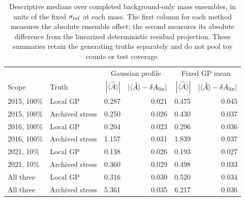 \begin{table}[H]\centering\small
\begin{tabular}{llrrrr}\toprule
 & & \multicolumn{2}{c}{Gaussian profile} & \multicolumn{2}{c}{Fixed GP mean}\\
Scope & Truth & $|\langle\hat A\rangle|$ & $|\langle\hat A\rangle-\delta A_{\rm lin}|$ & $|\langle\hat A\rangle|$ & $|\langle\hat A\rangle-\delta A_{\rm lin}|$\\\midrule
2015, 100\% & Local GP & 0.287 & 0.021 & 0.475 & 0.045\\
2015, 100\% & Archived stress & 0.250 & 0.026 & 0.430 & 0.037\\
2016, 100\% & Local GP & 0.204 & 0.023 & 0.296 & 0.036\\
2016, 100\% & Archived stress & 1.157 & 0.031 & 1.839 & 0.037\\
2021, 10\% & Local GP & 0.138 & 0.026 & 0.193 & 0.027\\
2021, 10\% & Archived stress & 0.360 & 0.029 & 0.498 & 0.033\\
All three & Local GP & 0.316 & 0.030 & 0.520 & 0.034\\
All three & Archived stress & 5.361 & 0.035 & 6.217 & 0.036\\
\bottomrule\end{tabular}
\caption{Descriptive medians over completed background-only mass ensembles, in units of the fixed $\sigma_{\rm ref}$ at each mass. The first column for each method measures the absolute ensemble offset; the second measures its absolute difference from the linearized deterministic residual projection. These summaries retain the generating truths separately and do not pool toy counts or test coverage.}
\label{tab:bias_projection}\end{table}
